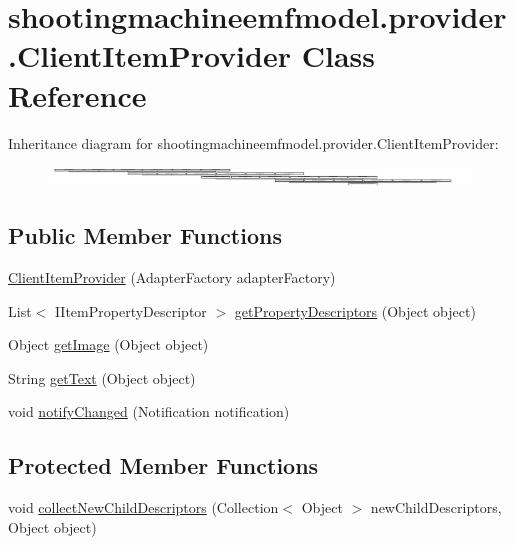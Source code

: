 \hypertarget{classshootingmachineemfmodel_1_1provider_1_1_client_item_provider}{\section{shootingmachineemfmodel.\-provider.\-Client\-Item\-Provider Class Reference}
\label{classshootingmachineemfmodel_1_1provider_1_1_client_item_provider}
}
Inheritance diagram for shootingmachineemfmodel.\-provider.\-Client\-Item\-Provider\-:\begin{figure}[H]
\begin{center}
\leavevmode
\includegraphics[height=0.534759cm]{classshootingmachineemfmodel_1_1provider_1_1_client_item_provider}
\end{center}
\end{figure}
\subsection*{Public Member Functions}
\begin{DoxyCompactItemize}
\item 
\hyperlink{classshootingmachineemfmodel_1_1provider_1_1_client_item_provider_ab61ff1827b564890b54bf58c1dc0eb96}{Client\-Item\-Provider} (Adapter\-Factory adapter\-Factory)
\item 
List$<$ I\-Item\-Property\-Descriptor $>$ \hyperlink{classshootingmachineemfmodel_1_1provider_1_1_client_item_provider_af186aa6da23c86abe1218efda21dba78}{get\-Property\-Descriptors} (Object object)
\item 
Object \hyperlink{classshootingmachineemfmodel_1_1provider_1_1_client_item_provider_afce85645d4fad479898bccfc71e6e192}{get\-Image} (Object object)
\item 
String \hyperlink{classshootingmachineemfmodel_1_1provider_1_1_client_item_provider_a1eb7d3650b81152025256f0176a8a632}{get\-Text} (Object object)
\item 
void \hyperlink{classshootingmachineemfmodel_1_1provider_1_1_client_item_provider_a4d0d4fb1a5be39ccc9afca184a2cb72d}{notify\-Changed} (Notification notification)
\end{DoxyCompactItemize}
\subsection*{Protected Member Functions}
\begin{DoxyCompactItemize}
\item 
void \hyperlink{classshootingmachineemfmodel_1_1provider_1_1_client_item_provider_a1da5113c3e55ba7d01828ca333aa1b47}{collect\-New\-Child\-Descriptors} (Collection$<$ Object $>$ new\-Child\-Descriptors, Object object)
\end{DoxyCompactItemize}


